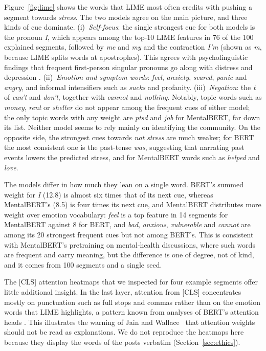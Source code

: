 Figure~\ref{fig:lime} shows the words that LIME most often credits with pushing a segment towards
\emph{stress}. The two models agree on the main picture, and three kinds of cue dominate.
(i)~\emph{Self-focus}: the single strongest cue for both models is the pronoun \emph{I}, which appears
among the top-10 LIME features in 76 of the 100 explained segments, followed by \emph{me} and \emph{my}
and the contraction \emph{I'm} (shown as \emph{m}, because LIME splits words at apostrophes).
This agrees with psycholinguistic findings that frequent first-person singular pronouns go along
with distress and depression \cite{rude2004language}. (ii)~\emph{Emotion and symptom words}:
\emph{feel}, \emph{anxiety}, \emph{scared}, \emph{panic} and \emph{angry}, and informal intensifiers such as
\emph{sucks} and profanity. (iii)~\emph{Negation}: the \emph{t} of \emph{can't} and \emph{don't}, together
with \emph{cannot} and \emph{nothing}. Notably, topic words such as \emph{money}, \emph{rent} or
\emph{shelter} do not appear among the frequent cues of either model; the only topic words with any
weight are \emph{ptsd} and \emph{job} for MentalBERT, far down its list. Neither model seems to rely
mainly on identifying the community. On the opposite side, the strongest cues towards
\emph{not stress} are much weaker; for BERT the most consistent one is the past-tense \emph{was},
suggesting that narrating past events lowers the predicted stress, and for MentalBERT words such as
\emph{helped} and \emph{love}.

The models differ in how much they lean on a single word. BERT's summed weight for \emph{I} (12.8) is
almost six times that of its next cue, whereas MentalBERT's (8.5) is four times its next cue, and
MentalBERT distributes more weight over emotion vocabulary: \emph{feel} is a top feature in 14
segments for MentalBERT against 8 for BERT, and \emph{bad}, \emph{anxious}, \emph{vulnerable} and
\emph{cannot} are among its 20 strongest frequent cues but not among BERT's. This is consistent with MentalBERT's
pretraining on mental-health discussions, where such words are frequent and carry meaning, but the
difference is one of degree, not of kind, and it comes from 100 segments and a single seed.

The [CLS] attention heatmaps that we inspected for four example segments offer little additional
insight. In the last layer, attention from [CLS] concentrates mostly on punctuation such as full stops
and commas rather than on the emotion words that LIME highlights, a pattern known from analyses of
BERT's attention heads \cite{clark2019does}. This illustrates the warning of Jain and Wallace~
that attention weights should not be read as explanations. We do not reproduce the heatmaps here
because they display the words of the posts verbatim (Section~\ref{sec:ethics}).

